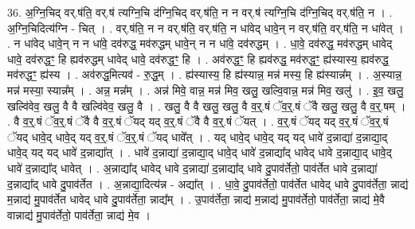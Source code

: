 \documentclass[17pt]{extarticle}
\begin{document}
36. अ॒ग्नि॒चिद् वर्.ष॑ति॒ वर्.ष॑ त्यग्नि॒चि द॑ग्नि॒चिद् वर्.ष॑ति॒ न न वर्.ष॑ त्यग्नि॒चि द॑ग्नि॒चिद् वर्.ष॑ति॒ न । . अ॒ग्नि॒चिदित्य॑ग्नि - चित् । . वर्.ष॑ति॒ न न वर्.ष॑ति॒ वर्.ष॑ति॒ न धा॑वेद् धावे॒न् न वर्.ष॑ति॒ वर्.ष॑ति॒ न धा॑वेत् । . न धा॑वेद् धावे॒न् न न धा॑वे॒ दव॑रुद्ध॒ मव॑रुद्धम् धावे॒न् न न धा॑वे॒ दव॑रुद्धम् । . धा॒वे॒ दव॑रुद्ध॒ मव॑रुद्धम् धावेद् धावे॒ दव॑रुद्धꣳ॒॒ हि ह्यव॑रुद्धम् धावेद् धावे॒ दव॑रुद्धꣳ॒॒ हि । . अव॑रुद्धꣳ॒॒ हि ह्यव॑रुद्ध॒ मव॑रुद्धꣳ॒॒ ह्य॑स्यास्य॒ ह्यव॑रुद्ध॒ मव॑रुद्धꣳ॒॒ ह्य॑स्य । . अव॑रुद्ध॒मित्यव॑ - रु॒द्ध॒म् । . ह्य॑स्यास्य॒ हि ह्य॑स्यान्न॒ मन्न॑ मस्य॒ हि ह्य॑स्यान्न᳚म् । . अ॒स्यान्न॒ मन्न॑ मस्या॒ स्यान्न᳚म् । . अन्न॒ मन्न᳚म् । . अन्न॑ मिवे॒ वान्न॒ मन्न॑ मिव॒ खलु॒ खल्वि॒वान्न॒ मन्न॑ मिव॒ खलु॑ । . इ॒व॒ खलु॒ खल्वि॑वेव॒ खलु॒ वै वै खल्वि॑वेव॒ खलु॒ वै । . खलु॒ वै वै खलु॒ खलु॒ वै व॒र्॒.षं ॅव॒र्॒.षं ॅवै खलु॒ खलु॒ वै व॒र्॒.षम् । . वै व॒र्॒.षं ॅव॒र्॒.षं ॅवै वै व॒र्॒.षं ॅयद् यद् व॒र्॒.षं ॅवै वै व॒र्॒.षं ॅयत् । . व॒र्॒.षं ॅयद् यद् व॒र्॒.षं ॅव॒र्॒.षं ॅयद् धावे॒द् धावे॒द् यद् व॒र्॒.षं ॅव॒र्॒.षं ॅयद् धावे᳚त् । . यद् धावे॒द् धावे॒द् यद् यद् धावे॑ द॒न्नाद्या॑ द॒न्नाद्या॒द् धावे॒द् यद् यद् धावे॑ द॒न्नाद्या᳚त् । . धावे॑ द॒न्नाद्या॑ द॒न्नाद्या॒द् धावे॒द् धावे॑ द॒न्नाद्या᳚द् धावेद् धावे द॒न्नाद्या॒द् धावे॒द् धावे॑ द॒न्नाद्या᳚द् धावेत् । . अ॒न्नाद्या᳚द् धावेद् धावे द॒न्नाद्या॑ द॒न्नाद्या᳚द् धावे दु॒पाव॑र्तेतो॒ पाव॑र्तेत धावे द॒न्नाद्या॑ द॒न्नाद्या᳚द् धावे दु॒पाव॑र्तेत । . अ॒न्नाद्या॒दित्य॑न्न - अद्या᳚त् । . धा॒वे॒ दु॒पाव॑र्तेतो॒ पाव॑र्तेत धावेद् धावे दु॒पाव॑र्तेता॒ न्नाद्य॑ म॒न्नाद्य॑ मु॒पाव॑र्तेत धावेद् धावे दु॒पाव॑र्तेता॒ न्नाद्य᳚म् । . उ॒पाव॑र्तेता॒ न्नाद्य॑ म॒न्नाद्य॑ मु॒पाव॑र्तेतो॒ पाव॑र्तेता॒ न्नाद्य॑ मे॒वै वान्नाद्य॑ मु॒पाव॑र्तेतो॒ पाव॑र्तेता॒ न्नाद्य॑ मे॒व । \newline
\end{document}
